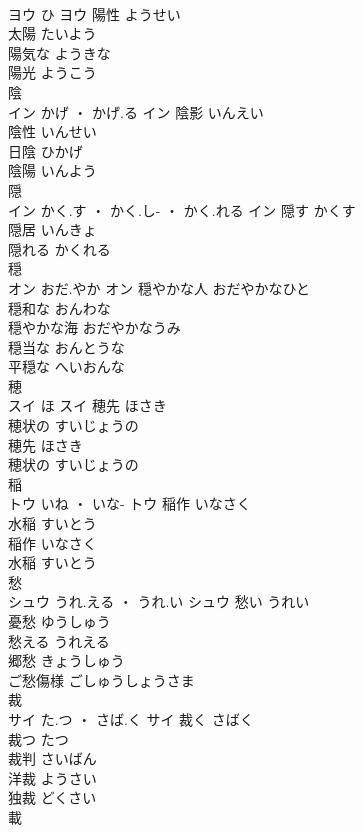 \documentclass[8pt]{extreport}
\begin{document}
\begin{CJK}{UTF8}{min}
\\	ヨウ	ひ	ヨウ	陽性	ようせい	
\\	太陽	たいよう	
\\	陽気な	ようきな	
\\	陽光	ようこう	
\\	陰	
\\	イン	かげ ・ かげ.る	イン	陰影	いんえい	
\\	陰性	いんせい	
\\	日陰	ひかげ	
\\	陰陽	いんよう	
\\	隠	
\\	イン	かく.す ・ かく.し- ・ かく.れる	イン	隠す	かくす	
\\	隠居	いんきょ	
\\	隠れる	かくれる	
\\	穏	
\\	オン	おだ.やか	オン	穏やかな人	おだやかなひと	
\\	穏和な	おんわな	
\\	穏やかな海	おだやかなうみ	
\\	穏当な	おんとうな	
\\	平穏な	へいおんな	
\\	穂	
\\	スイ	ほ	スイ	穂先	ほさき	
\\	穂状の	すいじょうの	
\\	穂先	ほさき	
\\	穂状の	すいじょうの	
\\	稲	
\\	トウ	いね ・ いな-	トウ	稲作	いなさく	
\\	水稲	すいとう	
\\	稲作	いなさく	
\\	水稲	すいとう	
\\	愁	
\\	シュウ	うれ.える ・ うれ.い	シュウ	愁い	うれい	
\\	憂愁	ゆうしゅう	
\\	愁える	うれえる	
\\	郷愁	きょうしゅう	
\\	ご愁傷様	ごしゅうしょうさま	
\\	裁	
\\	サイ	た.つ ・ さば.く	サイ	裁く	さばく	
\\	裁つ	たつ	
\\	裁判	さいばん	
\\	洋裁	ようさい	
\\	独裁	どくさい	
\\	載	

\end{CJK}
\end{document}
